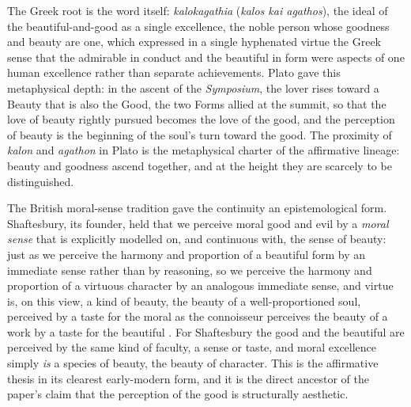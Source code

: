 The Greek root is the word itself: \emph{kalokagathia} (\zh{}\emph{kalos kai agathos}), the ideal of the beautiful-and-good as a single excellence, the noble person whose goodness and beauty are one, which expressed in a single hyphenated virtue the Greek sense that the admirable in conduct and the beautiful in form were aspects of one human excellence rather than separate achievements. Plato gave this metaphysical depth: in the ascent of the \emph{Symposium}, the lover rises toward a Beauty that is also the Good, the two Forms allied at the summit, so that the love of beauty rightly pursued becomes the love of the good, and the perception of beauty is the beginning of the soul's turn toward the good. The proximity of \emph{kalon} and \emph{agathon} in Plato is the metaphysical charter of the affirmative lineage: beauty and goodness ascend together, and at the height they are scarcely to be distinguished.

The British moral-sense tradition gave the continuity an epistemological form. Shaftesbury, its founder, held that we perceive moral good and evil by a \emph{moral sense} that is explicitly modelled on, and continuous with, the sense of beauty: just as we perceive the harmony and proportion of a beautiful form by an immediate sense rather than by reasoning, so we perceive the harmony and proportion of a virtuous character by an analogous immediate sense, and virtue is, on this view, a kind of beauty, the beauty of a well-proportioned soul, perceived by a taste for the moral as the connoisseur perceives the beauty of a work by a taste for the beautiful \parencite{shaftesbury2001}. For Shaftesbury the good and the beautiful are perceived by the same kind of faculty, a sense or taste, and moral excellence simply \emph{is} a species of beauty, the beauty of character. This is the affirmative thesis in its clearest early-modern form, and it is the direct ancestor of the paper's claim that the perception of the good is structurally aesthetic.

